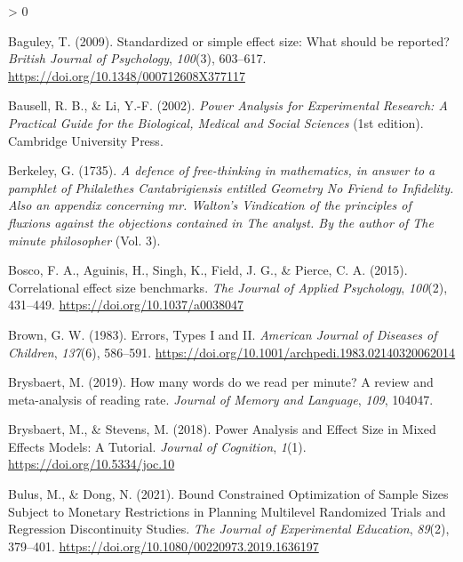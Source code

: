 \documentclass[
  english,
  ,jou,floatsintext]{apa6}
\newlength{\cslhangindent}
\newenvironment{CSLReferences}[2] %
 {%
  \setlength{\parindent}{0pt}
  \ifodd #1 \everypar{\setlength{\hangindent}{\cslhangindent}}\ignorespaces\fi
  \ifnum #2 > 0
  \setlength{\parskip}{#2\baselineskip}
  \fi
 }%
 {}
\begin{document}
\begin{CSLReferences}{1}{0}
\leavevmode\hypertarget{ref-baguley_standardized_2009}{}%
Baguley, T. (2009). Standardized or simple effect size: {What} should be reported? \emph{British Journal of Psychology}, \emph{100}(3), 603--617. \url{https://doi.org/10.1348/000712608X377117}

\leavevmode\hypertarget{ref-bausell_power_2002}{}%
Bausell, R. B., \& Li, Y.-F. (2002). \emph{Power {Analysis} for {Experimental Research}: {A Practical Guide} for the {Biological}, {Medical} and {Social Sciences}} (1st edition). {Cambridge University Press}.

\leavevmode\hypertarget{ref-berkeley_defence_1735}{}%
Berkeley, G. (1735). \emph{A defence of free-thinking in mathematics, in answer to a pamphlet of {Philalethes Cantabrigiensis} entitled {Geometry No Friend} to {Infidelity}. {Also} an appendix concerning mr. {Walton}'s {Vindication} of the principles of fluxions against the objections contained in {The} analyst. {By} the author of {The} minute philosopher} (Vol. 3).

\leavevmode\hypertarget{ref-bosco_correlational_2015}{}%
Bosco, F. A., Aguinis, H., Singh, K., Field, J. G., \& Pierce, C. A. (2015). Correlational effect size benchmarks. \emph{The Journal of Applied Psychology}, \emph{100}(2), 431--449. \url{https://doi.org/10.1037/a0038047}

\leavevmode\hypertarget{ref-brown_errors_1983}{}%
Brown, G. W. (1983). Errors, {Types I} and {II}. \emph{American Journal of Diseases of Children}, \emph{137}(6), 586--591. \url{https://doi.org/10.1001/archpedi.1983.02140320062014}

\leavevmode\hypertarget{ref-brysbaert_how_2019-1}{}%
Brysbaert, M. (2019). How many words do we read per minute? {A} review and meta-analysis of reading rate. \emph{Journal of Memory and Language}, \emph{109}, 104047.

\leavevmode\hypertarget{ref-brysbaert_power_2018}{}%
Brysbaert, M., \& Stevens, M. (2018). Power {Analysis} and {Effect Size} in {Mixed Effects Models}: {A Tutorial}. \emph{Journal of Cognition}, \emph{1}(1). \url{https://doi.org/10.5334/joc.10}

\leavevmode\hypertarget{ref-bulus_bound_2021}{}%
Bulus, M., \& Dong, N. (2021). Bound {Constrained Optimization} of {Sample Sizes Subject} to {Monetary Restrictions} in {Planning Multilevel Randomized Trials} and {Regression Discontinuity Studies}. \emph{The Journal of Experimental Education}, \emph{89}(2), 379--401. \url{https://doi.org/10.1080/00220973.2019.1636197}


\end{CSLReferences}
\end{document}
